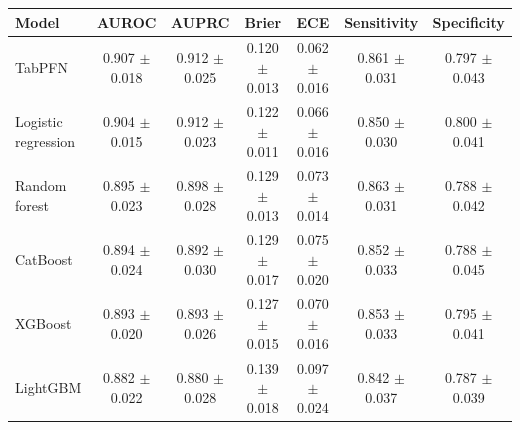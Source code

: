 \begin{tabular}{lcccccc}
\toprule
Model & AUROC & AUPRC & Brier & ECE & Sensitivity & Specificity \\
\midrule
TabPFN & 0.907 $\pm$ 0.018 & 0.912 $\pm$ 0.025 & 0.120 $\pm$ 0.013 & 0.062 $\pm$ 0.016 & 0.861 $\pm$ 0.031 & 0.797 $\pm$ 0.043 \\
Logistic regression & 0.904 $\pm$ 0.015 & 0.912 $\pm$ 0.023 & 0.122 $\pm$ 0.011 & 0.066 $\pm$ 0.016 & 0.850 $\pm$ 0.030 & 0.800 $\pm$ 0.041 \\
Random forest & 0.895 $\pm$ 0.023 & 0.898 $\pm$ 0.028 & 0.129 $\pm$ 0.013 & 0.073 $\pm$ 0.014 & 0.863 $\pm$ 0.031 & 0.788 $\pm$ 0.042 \\
CatBoost & 0.894 $\pm$ 0.024 & 0.892 $\pm$ 0.030 & 0.129 $\pm$ 0.017 & 0.075 $\pm$ 0.020 & 0.852 $\pm$ 0.033 & 0.788 $\pm$ 0.045 \\
XGBoost & 0.893 $\pm$ 0.020 & 0.893 $\pm$ 0.026 & 0.127 $\pm$ 0.015 & 0.070 $\pm$ 0.016 & 0.853 $\pm$ 0.033 & 0.795 $\pm$ 0.041 \\
LightGBM & 0.882 $\pm$ 0.022 & 0.880 $\pm$ 0.028 & 0.139 $\pm$ 0.018 & 0.097 $\pm$ 0.024 & 0.842 $\pm$ 0.037 & 0.787 $\pm$ 0.039 \\
\bottomrule
\end{tabular}
